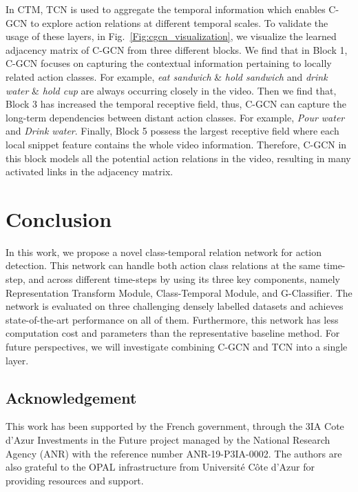 \documentclass{bmvc2k}
\begin{document}
In CTM, TCN is used to aggregate the temporal information which enables C-GCN to explore action relations at different temporal scales. 
{To validate the usage of these layers, in Fig.~\ref{Fig:cgcn_visualization}, we visualize the learned adjacency matrix of C-GCN from three different blocks.} 
We find that in Block 1, C-GCN focuses on capturing the contextual information pertaining to locally related action classes. For example, \textit{eat sandwich} \& \textit{hold sandwich} and \textit{drink water} \& \textit{hold cup} are always occurring closely in the video. 
Then we find that, Block 3 has increased the temporal receptive field, thus, C-GCN can capture the long-term dependencies between distant action classes. For example, \textit{Pour water} and \textit{Drink water}. 
{Finally, Block 5 possess the largest receptive field where each local snippet feature contains the whole video information. 
Therefore, C-GCN in this block models all the potential action relations in the video, resulting in many activated links in the adjacency matrix. }

\section{Conclusion}
{In this work, we propose a novel class-temporal relation network for action detection.
This network can handle both action class relations at the same time-step, and across different time-steps by using its three key components, namely Representation Transform Module, Class-Temporal Module, and G-Classifier.
The network is evaluated on three challenging densely labelled datasets and achieves state-of-the-art performance on all of them. Furthermore, this network has less computation cost and parameters than the representative baseline method. 
For future perspectives, we will investigate combining C-GCN and TCN into a single layer.}

\subsection*{Acknowledgement}
This work has been supported by the French government, through the 3IA Cote d’Azur Investments in the Future project managed by the National Research Agency (ANR) with the reference number ANR-19-P3IA-0002. The authors are also grateful to the OPAL infrastructure from Université Côte d’Azur for providing resources and support.

\end{document}
